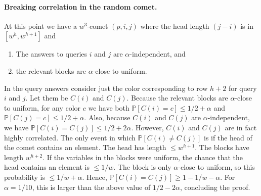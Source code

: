 \documentclass[10pt,a4paper]{article}
\begin{document}
\paragraph{Breaking correlation in the random comet.}
At this point we have a $w^3$-comet $(p,i,j)$ where the head length $(j-i)$ is in $[w^h,w^{h+1}]$ and
\begin{enumerate}
\item The answers to queries $i$ and $j$ are $\alpha$-independent, and
\item the relevant blocks are $\alpha$-close to uniform.
\end{enumerate}
In the query answers consider just the color corresponding to row $h+2$ for query $i$ and $j$. Let them be $C(i)$ and $C(j)$.
Because the relevant blocks are $\alpha$-close to uniform, for any color $c$ we have both $\mathbb P[C(i)=c]\leq1/2+\alpha$ and $\mathbb P[C(j)=c]\leq1/2+\alpha$. Also, because $C(i)$ and $C(j)$ are $\alpha$-independent, we have $\mathbb P[C(i)=C(j)]\leq1/2+2\alpha$.
However, $C(i)$ and $C(j)$ are in fact highly correlated. The only event in which $\mathbb P[C(i)\neq C(j)]$ is if the head of the comet contains an element. The head has length $\leq w^{h+1}$. The blocks have length $w^{h+2}$. If the variables in the blocks were uniform, the chance that the head contains an element is $\leq1/w$. The block is only $\alpha$-close to uniform, so this probability is $\leq1/w+\alpha$. Hence, $\mathbb P[C(i)=C(j)]\geq1-1/w-\alpha$. For $\alpha=1/10$, this is larger than the above value of $1/2-2\alpha$, concluding the proof.
\end{document}
